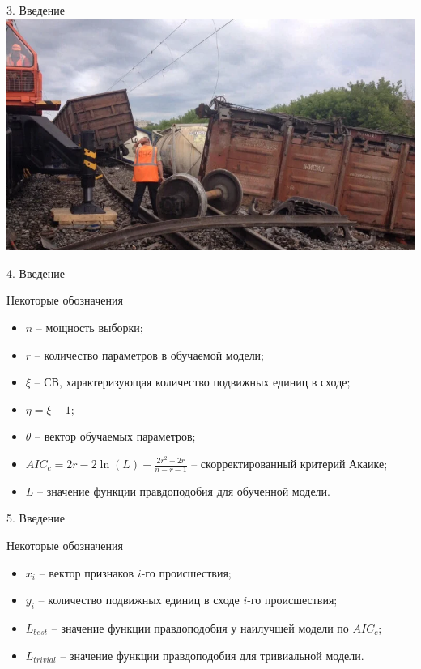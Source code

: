 \documentclass[aspectratio=169]{beamer}
\begin{document}
    \begin{frame}{3. Введение}
        \centering
        \includegraphics[width=0.7\linewidth]{src/крушение.png}
    \end{frame}

    \begin{frame}{4. Введение}
        \begin{block}{Некоторые обозначения}
            \begin{itemize}
                \item $n$ -- мощность выборки;
                \item $r$ -- количество параметров в обучаемой модели;
                \item $\xi$ -- СВ, характеризующая количество подвижных единиц в сходе;
                \item $\eta = \xi -1$;
                \item $\theta$ -- вектор обучаемых параметров;
                \item $AIC_c = 2r - 2\ln(L) + \frac{2r^2 + 2r}{n - r - 1}$ -- скорректированный критерий Акаике;
                \item $L$ -- значение функции правдоподобия для обученной модели.
            \end{itemize}
        \end{block}
    \end{frame}


    \begin{frame}{5. Введение}
        \begin{block}{Некоторые обозначения}
            \begin{itemize}
                \item $x_i$ -- вектор признаков $i$-го происшествия;
                \item $y_i$ -- количество подвижных единиц в сходе $i$-го происшествия;
                \item $L_{best}$ -- значение функции правдоподобия у наилучшей модели по $AIC_c$;
                \item $L_{trivial}$ -- значение функции правдоподобия для тривиальной модели.
            \end{itemize}
        \end{block}
    \end{frame}
\end{document}
